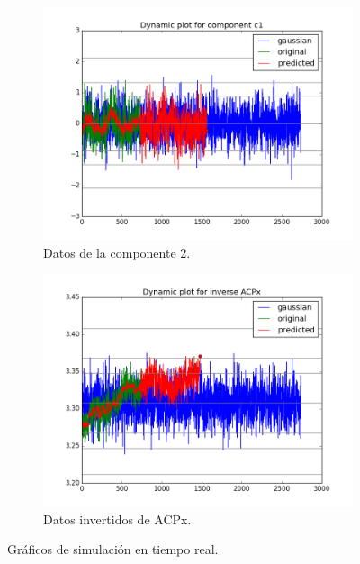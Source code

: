 \documentclass[11pt,spanish,listoffigures,listoftables]{tfgetsinf}
\begin{document}
        \begin{figure}[H]
            \centering
            \begin{subfigure}[h]{0.7\textwidth}
                \includegraphics[width=\textwidth]{matplotlib/c1_matplotlib_1.png}
                \caption{Datos de la componente 2.}
                \label{fig:c1_matplotlib}
            \end{subfigure}
            \begin{subfigure}[h]{0.7\textwidth}
                \includegraphics[width=\textwidth]{matplotlib/ACPx_matplotlib_1.png}
                \caption{Datos invertidos de ACPx.}
                \label{fig:ACPx_matplotlib}
            \end{subfigure}
            \caption{Gráficos de simulación en tiempo real.}
            \label{fig:matplotlib}
        \end{figure}
        
\end{document}
